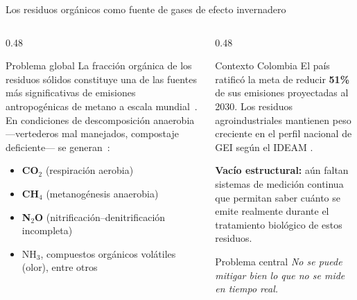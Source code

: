 \documentclass[aspectratio=169, 11pt]{beamer}
\begin{document}
\begin{frame}{Los residuos org\'{a}nicos como fuente de gases de efecto invernadero}
\begin{columns}[T]
\begin{column}{0.48\textwidth}
\begin{block}{Problema global}
\footnotesize
La fracci\'on org\'anica de los residuos s\'olidos 
constituye una de las fuentes m\'as significativas de 
emisiones antropog\'enicas de metano a escala 
mundial~\cite{lacknerAgriculturalWasteChallenges2025,kongEvaluatingGreenhouseGas2012}. 
En condiciones de descomposici\'on anaerobia 
---vertederos mal manejados, compostaje deficiente--- 
se generan~\cite{nordahlGreenhouseGasAir2023a}:

\vspace{0.1cm}
\begin{itemize}
    \item \textbf{CO$_2$} (respiraci\'on aerobia)
    \item \textbf{CH$_4$} (metanog\'enesis anaerobia)
    \item \textbf{N$_2$O} (nitrificaci\'on--denitrificaci\'on incompleta)
    \item NH$_3$, compuestos org\'anicos vol\'atiles (olor), entre otros
\end{itemize}
\end{block}
\end{column}
\begin{column}{0.48\textwidth}
\begin{exampleblock}{Contexto Colombia}
\footnotesize
El pa\'{i}s ratific\'{o} la meta de reducir \textbf{51\%} de sus emisiones proyectadas al 2030. Los residuos agroindustriales mantienen peso creciente en el perfil nacional de GEI seg\'{u}n el IDEAM \cite{tiriaACTUALIZACIONCONTRIBUCIONDETERMINADA,ideam2021inventario}.

\vspace{0.2cm}
\textbf{Vac\'{i}o estructural:} a\'{u}n faltan sistemas de medici\'{o}n continua que permitan saber cu\'{a}nto se emite realmente durante el tratamiento biol\'{o}gico de estos residuos.
\end{exampleblock}
\begin{alertblock}{Problema central}
\footnotesize
\textit{No se puede mitigar bien lo que no se mide en tiempo real.}
\end{alertblock}
\end{column}
\end{columns}
\end{frame}
\end{document}
